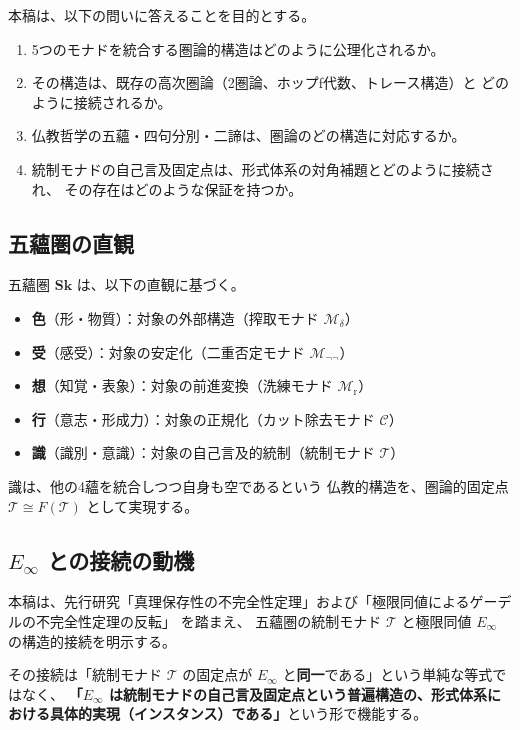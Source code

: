 \documentclass[11pt,a4paper]{article}
\theoremstyle{definition}
\newcommand{\Sk}{\mathbf{Sk}}
\newcommand{\Mdelta}{\mathcal{M}_{\delta}}
\newcommand{\Mneg}{\mathcal{M}_{\neg\neg}}
\newcommand{\Mr}{\mathcal{M}_{\mathrm{r}}}
\newcommand{\Mc}{\mathcal{C}}
\newcommand{\T}{\mathcal{T}}
\newcommand{\Einf}{E_{\infty}}
\begin{document}
本稿は、以下の問いに答えることを目的とする。

\begin{enumerate}
\item 5つのモナドを統合する圏論的構造はどのように公理化されるか。
\item その構造は、既存の高次圏論（2圏論、ホップf代数、トレース構造）と
  どのように接続されるか。
\item 仏教哲学の五蘊・四句分別・二諦は、圏論のどの構造に対応するか。
\item 統制モナドの自己言及固定点は、形式体系の対角補題とどのように接続され、
  その存在はどのような保証を持つか。
\end{enumerate}

\subsection{五蘊圏の直観}

五蘊圏 $\Sk$ は、以下の直観に基づく。

\begin{itemize}
\item \textbf{色}（形・物質）：対象の外部構造（搾取モナド $\Mdelta$）
\item \textbf{受}（感受）：対象の安定化（二重否定モナド $\Mneg$）
\item \textbf{想}（知覚・表象）：対象の前進変換（洗練モナド $\Mr$）
\item \textbf{行}（意志・形成力）：対象の正規化（カット除去モナド $\Mc$）
\item \textbf{識}（識別・意識）：対象の自己言及的統制（統制モナド $\T$）
\end{itemize}

識は、他の4蘊を統合しつつ自身も空であるという
仏教的構造を、圏論的固定点 $\T \cong F(\T)$ として実現する。

\subsection{$E_{\infty}$ との接続の動機}

本稿は、先行研究「真理保存性の不完全性定理」および「極限同値によるゲーデルの不完全性定理の反転」\cite{Chiba2026limit} を踏まえ、
五蘊圏の統制モナド $\T$ と極限同値 $\Einf$ の構造的接続を明示する。

その接続は「統制モナド $\T$ の固定点が $\Einf$ と\textbf{同一}である」という単純な等式ではなく、
\textbf{「$\Einf$ は統制モナドの自己言及固定点という普遍構造の、形式体系における具体的実現（インスタンス）である」}という形で機能する。
\end{document}
